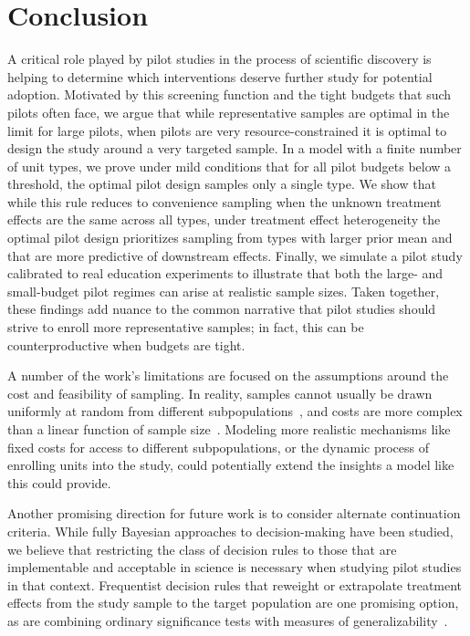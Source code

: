 \section{Conclusion}
\label{sec:conclusion}

A critical role played by pilot studies in the process of scientific discovery is helping to determine which interventions deserve further study for potential adoption.
Motivated by this screening function and the tight budgets that such pilots often face, we argue that while representative samples are optimal in the limit for large pilots, when pilots are very resource-constrained it is optimal to design the study around a very targeted sample.
In a model with a finite number of unit types, we prove under mild conditions that for all pilot budgets below a threshold, the optimal pilot design samples only a single type.
We show that while this rule reduces to convenience sampling when the unknown treatment effects are the same across all types, under treatment effect heterogeneity the optimal pilot design prioritizes sampling from types with larger prior mean and that are more predictive of downstream effects.
Finally, we simulate a pilot study calibrated to real education experiments to illustrate that both the large- and small-budget pilot regimes can arise at realistic sample sizes.
Taken together, these findings add nuance to the common narrative that pilot studies should strive to enroll more representative samples; in fact, this can be counterproductive when budgets are tight.

A number of the work's limitations are focused on the assumptions around the cost and feasibility of sampling.
In reality, samples cannot usually be drawn uniformly at random from different subpopulations~\cite{Tipton14}, and costs are more complex than a linear function of sample size~\cite{TiptonSp21}.
Modeling more realistic mechanisms like fixed costs for access to different subpopulations, or the dynamic process of enrolling units into the study, could potentially extend the insights a model like this could provide.

Another promising direction for future work is to consider alternate continuation criteria.
While fully Bayesian approaches to decision-making have been studied, we believe that restricting the class of decision rules to those that are implementable and acceptable in science is necessary when studying pilot studies in that context.
Frequentist decision rules that reweight or extrapolate treatment effects from the study sample to the target population are one promising option, as are combining ordinary significance tests with measures of generalizability~\cite{Tipton14}.
